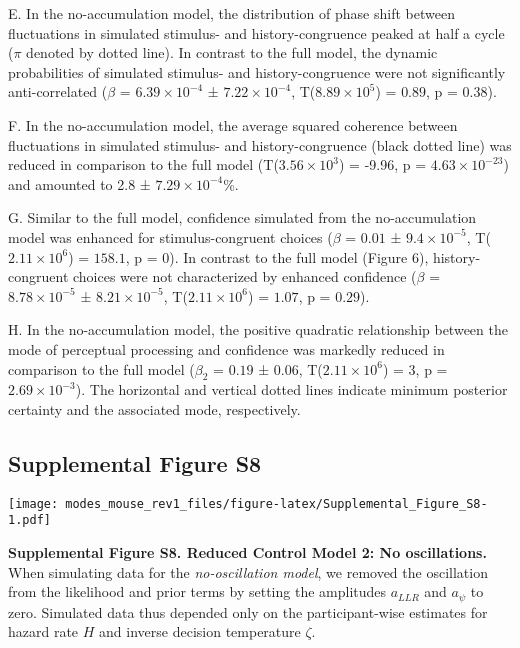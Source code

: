\documentclass[
]{article}
\begin{document}
E. In the no-accumulation model, the distribution of phase shift between
fluctuations in simulated stimulus- and history-congruence peaked at
half a cycle (\(\pi\) denoted by dotted line). In contrast to the full
model, the dynamic probabilities of simulated stimulus- and
history-congruence were not significantly anti-correlated (\(\beta\) =
\(\ensuremath{6.39\times 10^{-4}}\) ±
\(\ensuremath{7.22\times 10^{-4}}\),
T(\(\ensuremath{8.89\times 10^{5}}\)) = \(0.89\), p = \(0.38\)).

F. In the no-accumulation model, the average squared coherence between
fluctuations in simulated stimulus- and history-congruence (black dotted
line) was reduced in comparison to the full model
(T(\ensuremath{3.56\times 10^{3}}) = -9.96, p =
\(\ensuremath{4.63\times 10^{-23}}\)) and amounted to 2.8 ±
\ensuremath{7.29\times 10^{-4}}\%.

G. Similar to the full model, confidence simulated from the
no-accumulation model was enhanced for stimulus-congruent choices
(\(\beta\) = \(0.01\) ± \(\ensuremath{9.4\times 10^{-5}}\),
T(\(\ensuremath{2.11\times 10^{6}}\)) = \(158.1\), p = \(0\)). In
contrast to the full model (Figure 6), history-congruent choices were
not characterized by enhanced confidence (\(\beta\) =
\(\ensuremath{8.78\times 10^{-5}}\) ±
\(\ensuremath{8.21\times 10^{-5}}\),
T(\(\ensuremath{2.11\times 10^{6}}\)) = \(1.07\), p = \(0.29\)).

H. In the no-accumulation model, the positive quadratic relationship
between the mode of perceptual processing and confidence was markedly
reduced in comparison to the full model (\(\beta_2\) = \(0.19\) ±
\(0.06\), T(\(\ensuremath{2.11\times 10^{6}}\)) = \(3\), p =
\(\ensuremath{2.69\times 10^{-3}}\)). The horizontal and vertical dotted
lines indicate minimum posterior certainty and the associated mode,
respectively.

\newpage

\hypertarget{supplemental-figure-s8}{%
\subsection{Supplemental Figure S8}\label{supplemental-figure-s8}}

\texttt{[image: modes\_mouse\_rev1\_files/figure-latex/Supplemental\_Figure\_S8-1.pdf]}

\textbf{Supplemental Figure S8. Reduced Control Model 2: No
oscillations.} When simulating data for the \emph{no-oscillation model},
we removed the oscillation from the likelihood and prior terms by
setting the amplitudes \(a_{LLR}\) and \(a_{\psi}\) to zero. Simulated
data thus depended only on the participant-wise estimates for hazard
rate \(H\) and inverse decision temperature \(\zeta\).
\end{document}
